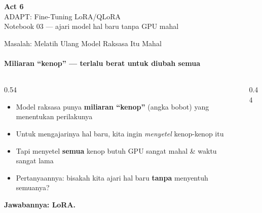 \documentclass[aspectratio=169,t]{beamer}
\newcommand{\acttitle}[3]{%
  \begin{frame}[plain]
    \vspace{1.5cm}
    \begin{center}
      {\color{nvgreen}\Huge\bfseries Act #1}\\[1.2em]
      {\color{nvwhite}\Huge #2}\\[0.8em]
      {\color{nvgray}\Large #3}
    \end{center}
  \end{frame}%
}
\begin{document}
\acttitle{6}{ADAPT: Fine-Tuning LoRA/QLoRA}{Notebook 03 --- ajari model hal baru tanpa GPU mahal}

\begin{frame}{Masalah: Melatih Ulang Model Raksasa Itu Mahal}
  \framesubtitle{Miliaran ``kenop'' --- terlalu berat untuk diubah semua}
  \begin{columns}[T]
    \begin{column}{0.54\textwidth}
      \footnotesize
      \begin{itemize}
        \item Model raksasa punya \textbf{miliaran ``kenop''} (angka bobot) yang menentukan perilakunya
        \item Untuk mengajarinya hal baru, kita ingin \emph{menyetel} kenop-kenop itu
        \item Tapi menyetel \textbf{semua} kenop butuh GPU sangat mahal \& waktu sangat lama
        \item Pertanyaannya: bisakah kita ajari hal baru \textbf{tanpa} menyentuh semuanya?
      \end{itemize}
      \vspace{0.3em}
      \textcolor{nvlightgreen}{\textbf{Jawabannya: LoRA.}}
    \end{column}
    \begin{column}{0.44\textwidth}
      \centering
    \end{column}
  \end{columns}
\end{frame}
\end{document}

